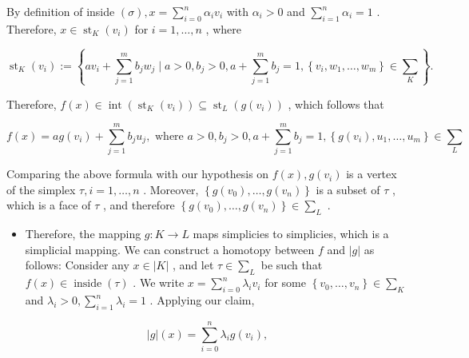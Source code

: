 By definition of inside \(\left( \sigma \right) ,x = \mathop{\sum }\limits_{{i = 0}}^{n}{\alpha }_{i}{v}_{i}\) with \({\alpha }_{i} > 0\) and \(\mathop{\sum }\limits_{{i = 1}}^{n}{\alpha }_{i} = 1\) . Therefore, \(x \in  {\operatorname{st}}_{K}\left( {v}_{i}\right)\) for \(i = 1,\ldots ,n\) , where

\[
{\operatorname{st}}_{K}\left( {v}_{i}\right)  \mathrel{\text{ := }} \left\{  {a{v}_{i} + \mathop{\sum }\limits_{{j = 1}}^{m}{b}_{j}{w}_{j} \mid  a > 0,{b}_{j} > 0,a + \mathop{\sum }\limits_{{j = 1}}^{m}{b}_{j} = 1,\left\{  {{v}_{i},{w}_{1},\ldots ,{w}_{m}}\right\}   \in  {\sum }_{K}}\right\}  .
\]

Therefore, \(f\left( x\right)  \in  \operatorname{int}\left( {{\operatorname{st}}_{K}\left( {v}_{i}\right) }\right)  \subseteq  {\operatorname{st}}_{L}\left( {g\left( {v}_{i}\right) }\right)\) , which follows that

\[
f\left( x\right)  = {ag}\left( {v}_{i}\right)  + \mathop{\sum }\limits_{{j = 1}}^{m}{b}_{j}{u}_{j},\text{ where }a > 0,{b}_{j} > 0,a + \mathop{\sum }\limits_{{j = 1}}^{m}{b}_{j} = 1,\left\{  {g\left( {v}_{i}\right) ,{u}_{1},\ldots ,{u}_{m}}\right\}   \in  {\sum }_{L}
\]

Comparing the above formula with our hypothesis on \(f\left( x\right) ,g\left( {v}_{i}\right)\) is a vertex of the simplex \(\tau ,i = 1,\ldots ,n\) . Moreover, \(\left\{  {g\left( {v}_{0}\right) ,\ldots ,g\left( {v}_{n}\right) }\right\}\) is a subset of \(\tau\) , which is a face of \(\tau\) , and therefore \(\left\{  {g\left( {v}_{0}\right) ,\ldots ,g\left( {v}_{n}\right) }\right\}   \in  {\sum }_{L}\) .

\begin{itemize}
\item Therefore, the mapping \(g : K \rightarrow  L\) maps simplicies to simplicies, which is a simplicial mapping. We can construct a homotopy between \(f\) and \(\left| g\right|\) as follows: Consider any \(x \in  \left| K\right|\) , and let \(\tau  \in  {\sum }_{L}\) be such that \(f\left( x\right)  \in  \operatorname{inside}\left( \tau \right)\) . We write \(x = \mathop{\sum }\limits_{{i = 0}}^{n}{\lambda }_{i}{v}_{i}\) for some \(\left\{  {{v}_{0},\ldots ,{v}_{n}}\right\}   \in  {\sum }_{K}\) and \({\lambda }_{i} > 0,\mathop{\sum }\limits_{{i = 1}}^{n}{\lambda }_{i} = 1\) . Applying our claim,
\end{itemize}

\[
\left| g\right| \left( x\right)  = \mathop{\sum }\limits_{{i = 0}}^{n}{\lambda }_{i}g\left( {v}_{i}\right) ,
\]

